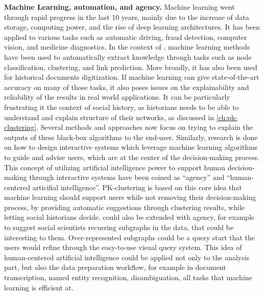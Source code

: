 \noindent\textbf{Machine Learning, automation, and agency.} Machine learning went through rapid progress in the last 10 years, mainly due to the increase of data storage, computing power, and the rise of deep learning architectures.
It has been applied to various tasks such as automatic driving, fraud detection, computer vision, and medicine diagnostics.
In the context of \sna, machine learning methods have been used to automatically extract knowledge through tasks such as node classification, clustering, and link prediction\cite{michalskiPredictingSocialNetwork2012}.
More broadly, it has also been used for historical documents digitization\cite{philipsHistoricalDocumentProcessing2020}.
If machine learning can give state-of-the-art accuracy on many of those tasks, it also poses issues on the explainability and reliability of the results in real world applications.
It can be particularly frustrating it the context of social history, as historians needs to be able to understand and explain structure of their networks, as discussed in \autoref{ch:pk-clustering}.
Several methods and approaches now focus on trying to explain the outputs of these black-box algorithms to the end-user\cite{holzingerMachineLearningExplainable2018}.
Similarly, research is done on how to design interactive systems which leverage machine learning algorithms to guide and advise users, which are at the center of the decision-making process.
This concept of utilizing artificial intelligence power to support human decision-making through interactive systems have been coined as ``agency''\cite{heerAgencyAutomationDesigning2019} and ``human-centered articifial intelligence''\cite{shneidermanHumanCenteredAI2022}.
PK-clustering is based on this core idea that machine learning should support users while not removing their decision-making process, by providing automatic suggestions through clustering results, while letting social historians decide.
\name could also be extended with agency, for example to suggest social scientists recurring subgraphs in the data, that could be interesting to them.
Over-represented subgraphs could be a query start that the users would refine through the easy-to-use visual query system.
This idea of human-centered artificial intelligence could be applied not only to the analysis part, but also the data preparation workflow, for example in document transcription, named entity recognition, disambiguation, all tasks that machine learning is efficient at.

